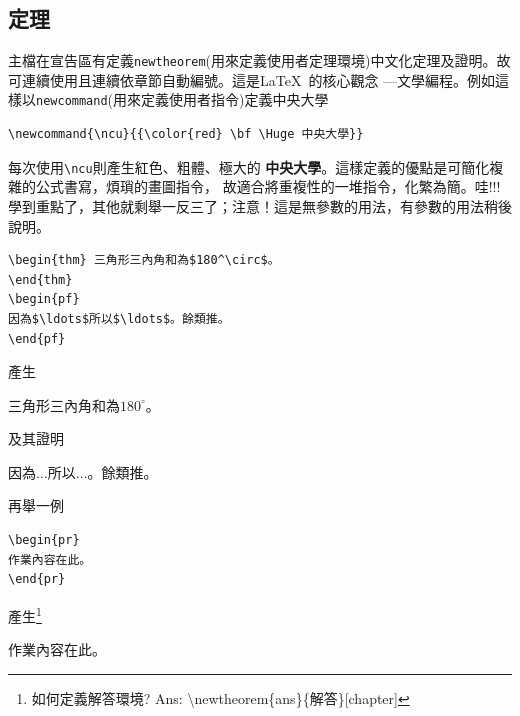 \subsection{定理}
主檔在宣告區有定義{\tt newtheorem}(用來定義使用者定理環境)中文化定理及證明。故可連續使用且連續依章節自動編號。這是\LaTeX\ 的核心觀念 ---文學編程。例如這樣以{\tt newcommand}(用來定義使用者指令)定義中央大學\\
\begin{Verbatim}[frame=single,firstline=1,label=Simple macro without parameters]
\newcommand{\ncu}{{\color{red} \bf \Huge 中央大學}}
\end{Verbatim}
\newcommand{\ncu}{{\color{red} \bf \Huge 中央大學}}%
每次使用\verb|\ncu|則產生紅色、粗體、極大的\ncu。這樣定義的優點是可簡化複雜的公式書寫，煩瑣的畫圖指令， 故適合將重複性的一堆指令，化繁為簡。哇!!!學到重點了，其他就剩舉一反三了；注意！這是無參數的用法，有參數的用法稍後說明。\\
\begin{Verbatim}[frame=single,firstline=1,label=Theorem]
\begin{thm} 三角形三內角和為$180^\circ$。
\end{thm}
\begin{pf}
因為$\ldots$所以$\ldots$。餘類推。
\end{pf} 
\end{Verbatim}
產生
\begin{thm} 三角形三內角和為$180^\circ$。  
\end{thm}
及其證明
\begin{pf}
因為$\ldots$所以$\ldots$。餘類推。
\end{pf} 
再舉一例
\begin{Verbatim}[frame=single,firstline=1,label=Problem]
\begin{pr}
作業內容在此。
\end{pr}
\end{Verbatim}
產生\footnote{如何定義解答環境? Ans: \textbackslash newtheorem\{ans\}\{解答\}[chapter]}
\begin{pr}
作業內容在此。
\end{pr}

